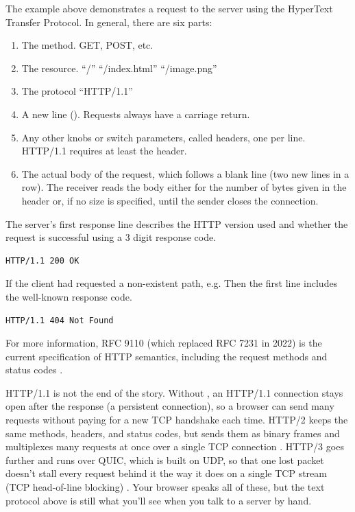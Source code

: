 The example above demonstrates a request to the server using the HyperText Transfer Protocol.
In general, there are six parts:

\begin{enumerate}
\item The method. GET, POST, etc.
\item The resource. ``/'' ``/index.html'' ``/image.png''
\item The protocol ``HTTP/1.1''
\item A new line (). Requests always have a carriage return.
\item Any other knobs or switch parameters, called headers, one per line. HTTP/1.1 requires at least the  header.
\item The actual body of the request, which follows a blank line (two new lines in a row).
  The receiver reads the body either for the number of bytes given in the  header or, if no size is specified, until the sender closes the connection.
\end{enumerate}

The server's first response line describes the HTTP version used and whether the request is successful using a 3 digit response code.

\begin{lstlisting}
HTTP/1.1 200 OK
\end{lstlisting}

If the client had requested a non-existent path, e.g.
 Then the first line includes the well-known  response code.

\begin{lstlisting}
HTTP/1.1 404 Not Found
\end{lstlisting}

For more information, RFC 9110 (which replaced RFC 7231 in 2022) is the current specification of HTTP semantics, including the request methods and status codes \cite{rfc9110}.

HTTP/1.1 is not the end of the story.
Without , an HTTP/1.1 connection stays open after the response (a persistent connection), so a browser can send many requests without paying for a new TCP handshake each time.
HTTP/2 keeps the same methods, headers, and status codes, but sends them as binary frames and multiplexes many requests at once over a single TCP connection \cite{rfc9113}.
HTTP/3 goes further and runs over QUIC, which is built on UDP, so that one lost packet doesn't stall every request behind it the way it does on a single TCP stream (TCP head-of-line blocking) \cite{rfc9114}.
Your browser speaks all of these, but the text protocol above is still what you'll see when you talk to a server by hand.

